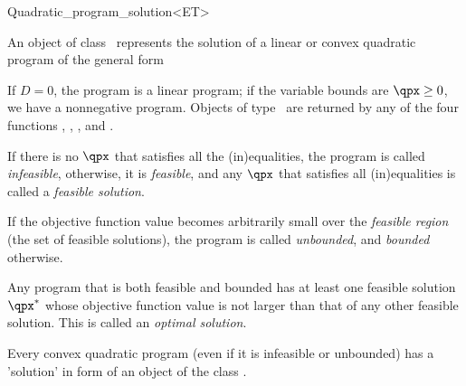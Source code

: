 \begin{ccRefClass}{Quadratic_program_solution<ET>}


\ccDefinition
An object of class \ccRefName\ represents the solution of a linear or 
convex quadratic program of the general form



If $D=0$, the program is
a linear program; if the variable bounds are $\qpx\geq 0$, we have a 
nonnegative program. Objects of type \ccRefName\ are returned by any of 
the four functions 
, ,
, and
. 

\ccExample
{}

If there is no $\qpx$ that satisfies all the (in)equalities,
the program is called \emph{infeasible}, otherwise, it is \emph{feasible},
and any $\qpx$ that satisfies all (in)equalities is called a \emph{feasible
solution}. 

If the objective function value becomes arbitrarily small over the
\emph{feasible region} (the set of feasible solutions), the program
is called \emph{unbounded}, and \emph{bounded} otherwise. 

Any program that is both feasible and bounded has at least one
feasible solution $\qpx^*$ whose objective function value is not larger
than that of any other feasible solution. This is called an 
\emph{optimal solution}.

Every convex quadratic program (even if it is infeasible or unbounded)
has a 'solution' in form of an object of the class \ccRefName.

\ccTypes






\end{ccRefClass}
